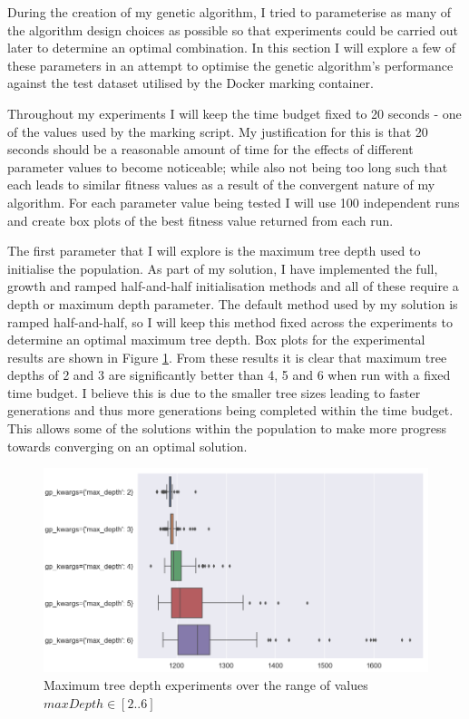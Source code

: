 \documentclass[11pt]{article}
\begin{document}
During the creation of my genetic algorithm, I tried to parameterise as many of the algorithm design choices as possible so that experiments could be carried out later to determine an optimal combination.
In this section I will explore a few of these parameters in an attempt to optimise the genetic algorithm's performance against the test dataset utilised by the Docker marking container.

Throughout my experiments I will keep the time budget fixed to 20 seconds - one of the values used by the marking script.
My justification for this is that 20 seconds should be a reasonable amount of time for the effects of different parameter values to become noticeable; while also not being too long such that each leads to similar fitness values as a result of the convergent nature of my algorithm.
For each parameter value being tested I will use 100 independent runs and create box plots of the best fitness value returned from each run.

The first parameter that I will explore is the maximum tree depth used to initialise the population.
As part of my solution, I have implemented the full, growth and ramped half-and-half initialisation methods and all of these require a depth or maximum depth parameter.
The default method used by my solution is ramped half-and-half, so I will keep this method fixed across the experiments to determine an optimal maximum tree depth.
Box plots for the experimental results are shown in Figure \ref{fig:max_depth}.
From these results it is clear that maximum tree depths of 2 and 3 are significantly better than 4, 5 and 6 when run with a fixed time budget.
I believe this is due to the smaller tree sizes leading to faster generations and thus more generations being completed within the time budget.
This allows some of the solutions within the population to make more progress towards converging on an optimal solution.

\begin{figure}[h]
\includegraphics[scale=0.45]{max_depth}
\centering
\caption{Maximum tree depth experiments over the range of values $maxDepth \in [2..6]$}
\label{fig:max_depth}
\end{figure}
\end{document}
